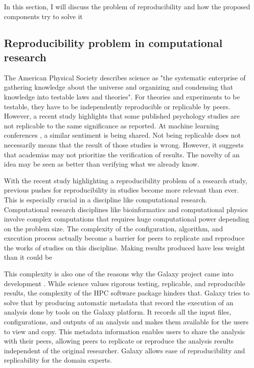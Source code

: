 In this section, I will discuss the problem of reproducibility and how the proposed components try to solve it

\subsection{Reproducibility problem in computational research}

The American Physical Society \citep{APS:aa} describes science as "the systematic enterprise of gathering knowledge about the universe and organizing and condensing that knowledge into testable laws and theories". For theories and experiments to be testable, they have to be independently reproducible or replicable by peers. However, a recent study \citep{open2015estimating} highlights  that some published psychology studies are not replicable to the same significance as reported. At machine learning conferences \citep{drummond2009replicability}, a similar sentiment is being shared. Not being replicable does not necessarily means that the result of those studies is wrong. However, it suggests that academias may not prioritize the verification of results. The novelty of an idea may be seen as better than verifying what we already know.

With the recent study highlighting a reproducibility problem of a research study, previous pushes \citep{donoho2010invitation, sandve2013ten} for reproducibility in studies become more relevant than ever. This is especially crucial in a discipline like computational research. Computational research disciplines like bioinformatics and computational physics involve complex computations that requires huge computational power depending on the problem size. The complexity of the configuration, algorithm, and execution process actually become a barrier for peers to replicate and reproduce the works of studies on this discipline. Making results produced have less weight than it could be

This complexity is also one of the reasons why the Galaxy project came into development \citep{goecks2010galaxy}. While science values rigorous testing, replicable, and reproducible results, the complexity of the HPC software package hinders that. Galaxy tries to solve that by producing automatic metadata that record the execution of an analysis done by tools on the Galaxy platform. It records all the input files, configurations, and outputs of an analysis and makes them available for the users to view and copy. This metadata information enables users to share the analysis with their peers, allowing peers to replicate or reproduce the analysis results independent of the original researcher. Galaxy allows ease of reproducibility and replicability for the domain experts. 



